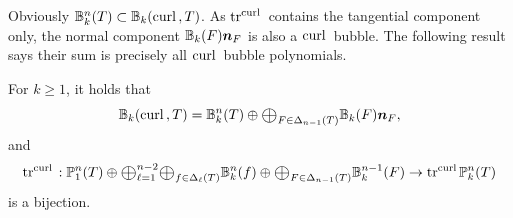 \documentclass[mathpazo]{cicp}
\newcommand{\Oplus}{\ensuremath{\vcenter{\hbox{\scalebox{1.5}{$\oplus$}}}}}
\begin{document}
Obviously $\mathbb B_k^n(T)\subset \mathbb B_k({\rm curl\,}, T)$. As $\operatorname{tr}^{{\rm curl\,}}$ contains the tangential component only, the normal component $\mathbb B_k(F)\boldsymbol n_F$ is also a ${\rm curl\,}$ bubble. The following result says their sum is precisely all ${\rm curl\,}$ bubble polynomials.  
\begin{theorem}\label{thm:curlbubbletracespacedecomp}
For $k\geq 1$, it holds that
\begin{equation}\label{eq:curlbubbledecomp}
\mathbb B_k(\curl, T) =  \mathbb B_k^n(T) \oplus \Oplus_{F\in \Delta_{n-1}(T)} \mathbb B_k(F)\bs n_F,
\end{equation}
and
\begin{equation}\label{eq:trNrf}
{\rm tr}^{\curl} : \mathbb P_1^n(T)\oplus \Oplus_{\ell = 1}^{n-2}\Oplus_{f\in \Delta_{\ell}(T)} \mathbb B_k^n(f)\oplus \Oplus_{F\in \Delta_{n-1}(T)}  \mathbb B_k^{n-1}(F) \to  {\rm tr}^{\curl} \mathbb P_k^n(T)
\end{equation} 
is a bijection.
\end{theorem}
\end{document}
